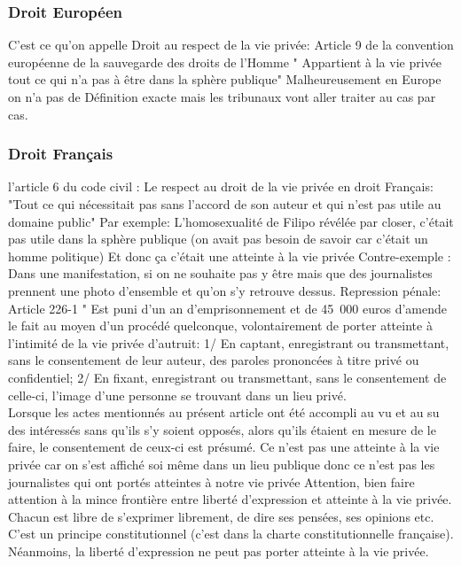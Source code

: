 \documentclass{article}
\begin{document}
\subsubsection{Droit Européen}
C'est ce qu'on appelle Droit au respect de la vie privée: Article 9 de la convention européenne de la sauvegarde des droits de l'Homme 
" Appartient à la vie privée tout ce qui n'a pas à être dans la sphère publique" 
Malheureusement en Europe on n'a pas de Définition exacte mais les tribunaux vont aller traiter au cas par cas.
\subsubsection{Droit Français}
l'article 6 du code civil :
Le respect au droit de la vie privée en droit Français: "Tout ce qui nécessitait pas sans l'accord de son auteur et qui n'est pas utile au domaine public"
Par exemple: L'homosexualité de Filipo révélée par closer, c'était pas utile dans la sphère publique (on avait pas besoin de savoir car
c'était un homme politique)
Et donc ça c'était une atteinte à la vie privée
Contre-exemple : Dans une manifestation, si on ne souhaite pas y être mais que des journalistes prennent une photo d'ensemble et qu'on s'y retrouve dessus. 
Repression pénale: Article 226-1
" Est puni d'un an d'emprisonnement et de 45~000 euros d'amende le fait au moyen d'un procédé quelconque, volontairement de porter atteinte à l'intimité de la vie privée d'autruit:
1/ En captant, enregistrant ou transmettant, sans le consentement de leur auteur, des paroles prononcées à titre privé ou confidentiel;
2/ En fixant, enregistrant ou transmettant, sans le consentement de celle-ci, l'image d'une personne se trouvant dans un lieu privé.\\
Lorsque les actes mentionnés au présent article ont été accompli au vu et au su des intéressés sans qu'ils s'y soient opposés, alors qu'ils étaient en mesure de le faire, le consentement de ceux-ci est présumé.
Ce n'est pas une atteinte à la vie privée car on s'est affiché soi même dans un lieu publique donc ce n'est pas les journalistes qui ont portés atteintes à notre vie privée 
Attention, bien faire attention à la mince frontière entre liberté d'expression et atteinte à la vie privée.
Chacun est libre de s'exprimer librement, de dire ses pensées, ses opinions etc. C'est un principe constitutionnel (c'est dans la charte constitutionnelle française).  Néanmoins, la liberté d'expression ne peut pas porter atteinte à la vie privée. 
\end{document}
